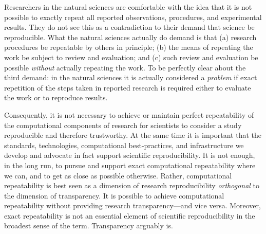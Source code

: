  Researchers in the natural sciences are comfortable with the idea that it is not possible to exactly
	repeat all reported observations, procedures, and experimental results.
They do not see this as a contradiction to their demand that science be reproducible.
What the natural sciences actually do demand is that 
	(a) research procedures be repeatable by others in principle;
	(b) the means of repeating the work be subject to review and evaluation; 
	and (c) such review and evaluation be possible \emph{without} actually repeating the work.
To be perfectly clear about the third demand: in the natural sciences it is actually considered a 
	\emph{problem} if exact repetition of the steps taken in reported research is required either
	to evaluate the work or to reproduce results.

Consequently, it is not necessary to achieve or 
	maintain perfect repeatability of the computational components of research for scientists to 
	consider a study reproducible and therefore trustworthy.
At the same time it is important that the standards, technologies, 
	computational best-practices, and infrastructure we develop and advocate in fact support scientific reproducibility.
It is not enough, in the long run, to pursue and support exact computational repeatability where we can, 
	and to get as close as possible otherwise.
Rather, computational repeatability is best seen as a dimension of research reproducibility \emph{orthogonal} to 
	the dimension of transparency.
It is possible to achieve computational repeatability without providing research transparency---and vice versa.
Moreover, exact repeatability is not an essential element of scientific reproducibility in the broadest sense of the term.
Transparency arguably is.
